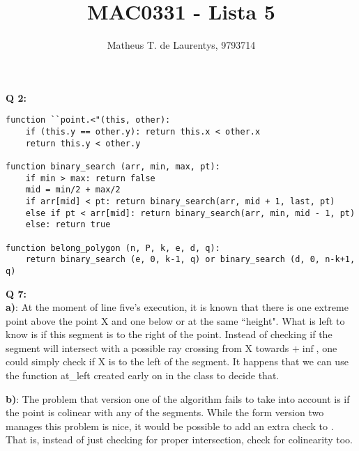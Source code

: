 \documentclass[]{article}
\title{\vspace{-4.0cm}MAC0331 - Lista 5}
\author{Matheus T. de Laurentys, 9793714}
\begin{document}
	\maketitle
	\noindent
	\textbf{Q 2:} \\
	\begin{lstlisting}
function ``point.<"(this, other):
	if (this.y == other.y): return this.x < other.x
	return this.y < other.y

function binary_search (arr, min, max, pt):
	if min > max: return false
	mid = min/2 + max/2
	if arr[mid] < pt: return binary_search(arr, mid + 1, last, pt)
	else if pt < arr[mid]: return binary_search(arr, min, mid - 1, pt)
	else: return true
	
function belong_polygon (n, P, k, e, d, q):
	return binary_search (e, 0, k-1, q) or binary_search (d, 0, n-k+1, q)
	\end{lstlisting}
	
	\noindent
	\textbf{Q 7:} \\
	\textbf{a)}: At the moment of line five's execution, it is known that there is one extreme point above the point X and one below or at the same ``height". What is left to know is if this segment is to the right of the point. Instead of checking if the segment will intersect with a possible ray crossing from X towards $+\inf$, one could simply check if X is to the left of the segment. It happens that we can use the function at\_left created early on in the class to decide that.
	
	\noindent
	\textbf{b)}: The problem that version one of the algorithm fails to take into account is if the point is colinear with any of the segments. While the form version two manages this problem is nice, it would be possible to add an extra check to . That is, instead of just checking for proper intersection, check for colinearity too.
\end{document}
